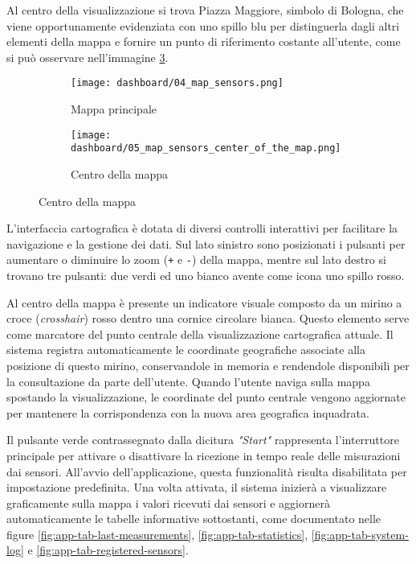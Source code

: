 Al centro della visualizzazione si trova Piazza Maggiore, simbolo di Bologna, che viene opportunamente evidenziata
con uno spillo blu per distinguerla dagli altri elementi della mappa e fornire un punto di riferimento
costante all'utente, come si può osservare nell'immagine \ref{fig:app-map-center}.

\begin{figure}
  \centering
  \begin{subfigure}{\textwidth}
    \centering
    \texttt{[image: dashboard/04\_map\_sensors.png]}
    \caption{Mappa principale}
    \label{fig:app-map-sensors}
  \end{subfigure}

  \hfil
  \begin{subfigure}{\textwidth}
    \centering
    \texttt{[image: dashboard/05\_map\_sensors\_center\_of\_the\_map.png]}
    \caption{Centro della mappa}
    \label{fig:app-map-center}
  \end{subfigure}
\end{figure}

L'interfaccia cartografica è dotata di diversi controlli interattivi per facilitare la navigazione e la
gestione dei dati.
Sul lato sinistro sono posizionati i pulsanti per aumentare o diminuire lo zoom (\texttt{+} e \texttt{-}) della mappa,
mentre sul lato destro si trovano tre pulsanti: due verdi ed uno bianco avente come icona uno spillo rosso.

Al centro della mappa è presente un indicatore visuale composto da un mirino a croce (\textit{crosshair}) rosso
dentro una cornice circolare bianca. Questo elemento serve come marcatore del punto centrale della
visualizzazione cartografica attuale. Il sistema registra automaticamente le coordinate geografiche associate
alla posizione di questo mirino, conservandole in memoria e rendendole disponibili per la consultazione
da parte dell'utente. Quando l'utente naviga sulla mappa spostando la visualizzazione, le coordinate
del punto centrale vengono aggiornate per mantenere la corrispondenza con la nuova area geografica inquadrata.

Il pulsante verde contrassegnato dalla dicitura \textit{"Start"} rappresenta l'interruttore principale
per attivare o disattivare la ricezione in tempo reale delle misurazioni dai sensori.
All'avvio dell'applicazione, questa funzionalità risulta disabilitata per impostazione predefinita.
Una volta attivata, il sistema inizierà a visualizzare graficamente sulla mappa
i valori ricevuti dai sensori e aggiornerà automaticamente le tabelle informative sottostanti,
come documentato nelle figure \ref{fig:app-tab-last-measurements}, \ref{fig:app-tab-statistics},
\ref{fig:app-tab-system-log} e \ref{fig:app-tab-registered-sensors}.

